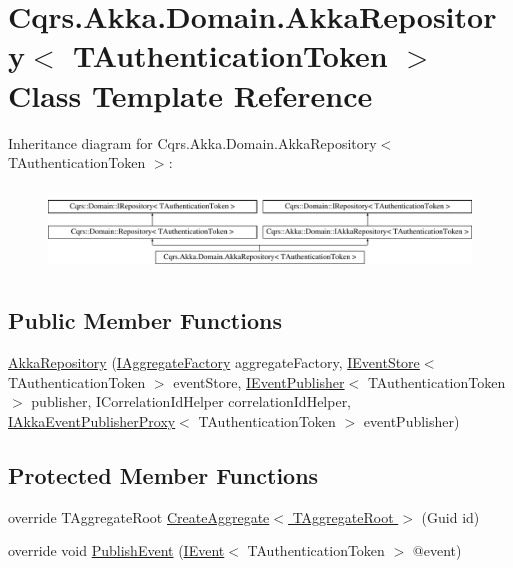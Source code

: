 \hypertarget{classCqrs_1_1Akka_1_1Domain_1_1AkkaRepository}{}\section{Cqrs.\+Akka.\+Domain.\+Akka\+Repository$<$ T\+Authentication\+Token $>$ Class Template Reference}
\label{classCqrs_1_1Akka_1_1Domain_1_1AkkaRepository}
Inheritance diagram for Cqrs.\+Akka.\+Domain.\+Akka\+Repository$<$ T\+Authentication\+Token $>$\+:\begin{figure}[H]
\begin{center}
\leavevmode
\includegraphics[height=2.270270cm]{classCqrs_1_1Akka_1_1Domain_1_1AkkaRepository}
\end{center}
\end{figure}
\subsection*{Public Member Functions}
\begin{DoxyCompactItemize}
\item 
\hyperlink{classCqrs_1_1Akka_1_1Domain_1_1AkkaRepository_a2279bbdecbc33f50b20159aaec0805bf}{Akka\+Repository} (\hyperlink{interfaceCqrs_1_1Domain_1_1Factories_1_1IAggregateFactory}{I\+Aggregate\+Factory} aggregate\+Factory, \hyperlink{interfaceCqrs_1_1Events_1_1IEventStore}{I\+Event\+Store}$<$ T\+Authentication\+Token $>$ event\+Store, \hyperlink{interfaceCqrs_1_1Events_1_1IEventPublisher}{I\+Event\+Publisher}$<$ T\+Authentication\+Token $>$ publisher, I\+Correlation\+Id\+Helper correlation\+Id\+Helper, \hyperlink{interfaceCqrs_1_1Akka_1_1Events_1_1IAkkaEventPublisherProxy}{I\+Akka\+Event\+Publisher\+Proxy}$<$ T\+Authentication\+Token $>$ event\+Publisher)
\end{DoxyCompactItemize}
\subsection*{Protected Member Functions}
\begin{DoxyCompactItemize}
\item 
override T\+Aggregate\+Root \hyperlink{classCqrs_1_1Akka_1_1Domain_1_1AkkaRepository_ad8861fdcfc749c9caae4dacf1284aa7d}{Create\+Aggregate$<$ T\+Aggregate\+Root $>$} (Guid id)
\item 
override void \hyperlink{classCqrs_1_1Akka_1_1Domain_1_1AkkaRepository_ae0ead40945c7600a3f3f38fa302ef35f}{Publish\+Event} (\hyperlink{interfaceCqrs_1_1Events_1_1IEvent}{I\+Event}$<$ T\+Authentication\+Token $>$ @event)
\end{DoxyCompactItemize}
